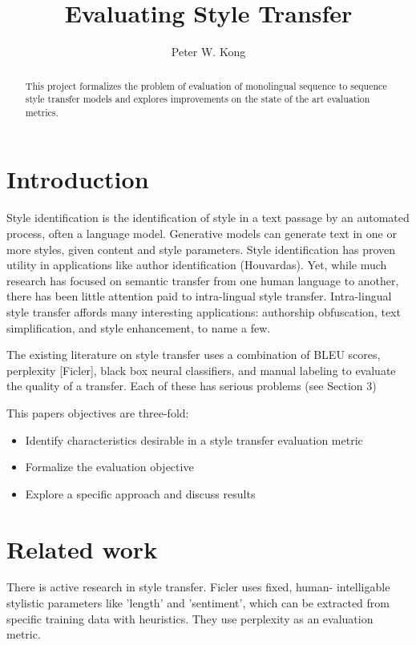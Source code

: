 \documentclass[letterpaper, 10 pt, conference]{ieeeconf}  %
\title{\LARGE \bf
Evaluating Style Transfer
}
\author{Peter W. Kong}
\begin{document}
\maketitle
\thispagestyle{empty}
\pagestyle{empty}

\begin{abstract}

This project formalizes the problem of evaluation of monolingual sequence to sequence style transfer models and explores improvements on the state of the art evaluation metrics.

\end{abstract}

\section{Introduction}
Style identification is the identification of style in a text passage by an automated process, often a language model. Generative models can generate text in one or more styles, given content and style parameters. Style identification has proven utility in applications like author identification (Houvardas). Yet, while much research has focused on semantic transfer from one human language to another, there has been little attention paid to intra-lingual style transfer. Intra-lingual style transfer affords many interesting applications: authorship obfuscation, text simplification, and style enhancement, to name a few.

The existing literature on style transfer uses a combination of BLEU scores, perplexity [Ficler], black box neural classifiers, and manual labeling to evaluate the quality of a transfer. Each of these has serious problems (see Section 3)


This paper\textquotesingle s objectives are three-fold:
\begin{itemize}
    \item Identify characteristics desirable in a style transfer evaluation metric
    \item Formalize the evaluation objective
    \item Explore a specific approach and discuss results
\end{itemize} 
\section{Related work}

There is active research in style transfer. Ficler uses fixed, human- intelligable stylistic parameters like ’length’ and ’sentiment’, which can be extracted from specific training data with heuristics. They use perplexity as an evaluation metric.
\\ 
\end{document}
